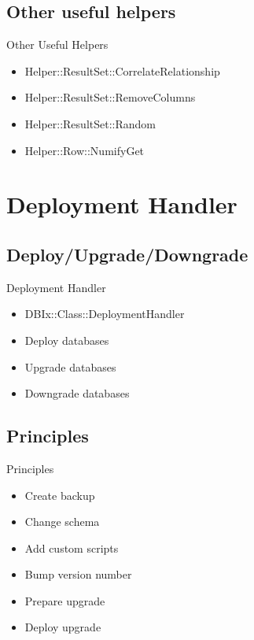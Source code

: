 \subsection{Other useful helpers}
\begin{frame}{Other Useful Helpers}
\begin{itemize}
\item Helper::ResultSet::CorrelateRelationship
\item Helper::ResultSet::RemoveColumns
\item Helper::ResultSet::Random
\item Helper::Row::NumifyGet
\end{itemize}
\end{frame}


\section{Deployment Handler}

\subsection{Deploy/Upgrade/Downgrade}

\begin{frame}{Deployment Handler}
\begin{itemize}
\item DBIx::Class::DeploymentHandler
\item Deploy databases
\item Upgrade databases
\item Downgrade databases
\end{itemize}
\end{frame}

\subsection{Principles}

\begin{frame}{Principles}
\begin{itemize}
\item Create backup
\item Change schema
\item Add custom scripts
\item Bump version number
\item Prepare upgrade
\item Deploy upgrade
\end{itemize}
\end{frame}

